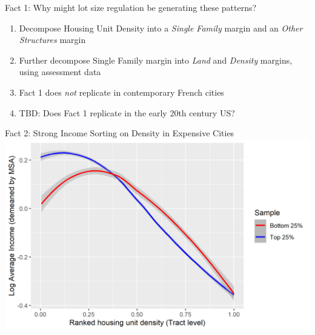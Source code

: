 \documentclass{beamer}
\theoremstyle{plain}
\begin{document}
\begin{frame}{Fact 1: Why might lot size regulation be generating these patterns?}
\begin{enumerate}
	\label{return}
	\itemsep1em
	\color{black}
	\item Decompose Housing Unit Density into a \color{red} \textit{Single Family} \color{black} margin and an \color{red} \textit{Other Structures} \color{black} margin \hyperlink{1}{} 
	
	\item Further decompose Single Family margin into \color{red} \textit{Land} \color{black} and  \color{red} \textit{Density} \color{black} margins, using assessment data \hyperlink{2}{} 
	
	\item Fact 1 does \color{red} \textit{not} \color{black} replicate in contemporary French cities \hyperlink{3}{} 
	
	\item TBD: Does Fact 1 replicate in the early 20th century US? 
\end{enumerate}
	
\end{frame}


\begin{frame}{Fact 2: Strong Income Sorting on Density in Expensive Cities}
	\includegraphics[width= \textwidth]{income.png}
\end{frame}
\end{document}
